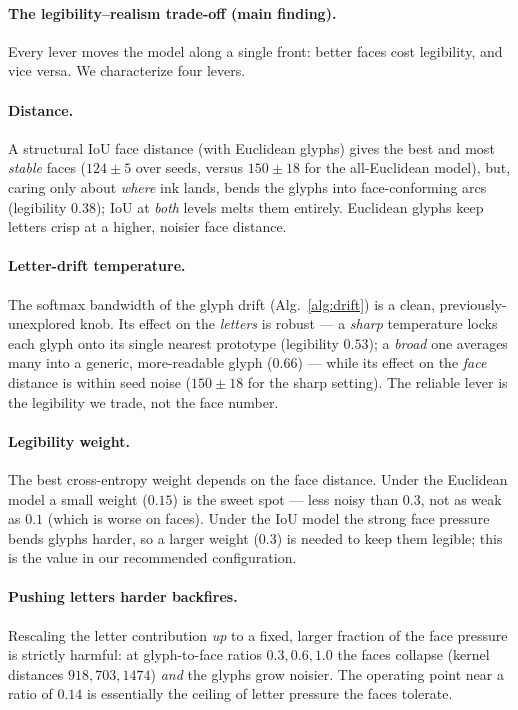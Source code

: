 \documentclass{article}
\begin{document}
\paragraph{The legibility--realism trade-off (main finding).} Every lever moves the model along a
single front: better faces cost legibility, and vice versa. We characterize four levers.

\paragraph{Distance.} A structural IoU face distance (with Euclidean glyphs) gives the best and most
\emph{stable} faces ($124\pm5$ over seeds, versus $150\pm18$ for the all-Euclidean model), but, caring
only about \emph{where} ink lands, bends the glyphs into face-conforming arcs (legibility $0.38$); IoU
at \emph{both} levels melts them entirely. Euclidean glyphs keep letters crisp at a higher, noisier face
distance.

\paragraph{Letter-drift temperature.} The softmax bandwidth of the glyph drift (Alg.~\ref{alg:drift}) is
a clean, previously-unexplored knob. Its effect on the \emph{letters} is robust --- a \emph{sharp}
temperature locks each glyph onto its single nearest prototype (legibility $0.53$); a \emph{broad} one
averages many into a generic, more-readable glyph ($0.66$) --- while its effect on the \emph{face}
distance is within seed noise ($150\pm18$ for the sharp setting). The reliable lever is the legibility
we trade, not the face number.

\paragraph{Legibility weight.} The best cross-entropy weight depends on the face distance. Under the
Euclidean model a small weight ($0.15$) is the sweet spot --- less noisy than $0.3$, not as weak as
$0.1$ (which is worse on faces). Under the IoU model the strong face pressure bends glyphs harder, so a
larger weight ($0.3$) is needed to keep them legible; this is the value in our recommended
configuration.

\paragraph{Pushing letters harder backfires.} Rescaling the letter contribution \emph{up} to a fixed,
larger fraction of the face pressure is strictly harmful: at glyph-to-face ratios $0.3,0.6,1.0$ the
faces collapse (kernel distances $918,703,1474$) \emph{and} the glyphs grow noisier. The operating point
near a ratio of $0.14$ is essentially the ceiling of letter pressure the faces tolerate.
\end{document}
